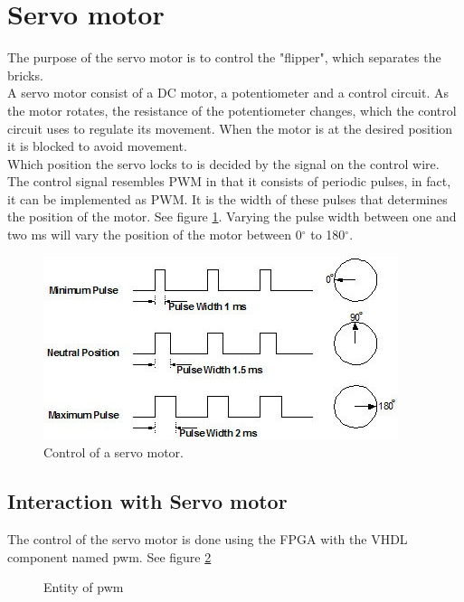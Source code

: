 \section{Servo motor}
The purpose of the servo motor is to control the "flipper", which separates the bricks. \\


A servo motor consist of a DC motor, a potentiometer and a control circuit.
As the motor rotates, the resistance of the potentiometer changes,  which the control circuit uses to regulate its movement.
When the motor is at the desired position it is blocked to avoid movement.\\


Which position the servo locks to is decided by the signal on the control wire.
The control signal resembles PWM in that it consists of periodic pulses, in fact, it can be implemented as PWM. 
It is the width of these pulses that determines the position of the motor.
See figure \ref{fig:servoposition}. Varying the pulse width between one and two ms will vary the position of the motor between 0$^\circ$ to 180$^\circ$.
 
\begin{figure}[H]
\centering
\includegraphics[scale=0.6]{images/servocontrol.jpg}
\caption{Control of a servo motor.}
\label{fig:servoposition}
\end{figure}

\subsection{Interaction with Servo motor}
The control of the servo motor is done using the FPGA with the VHDL component named pwm. See figure \ref{fig:pwmcomp}

\begin{figure}[htb]
\centering
{}
\caption{Entity of pwm}
\label{fig:pwmcomp}
\end{figure}

